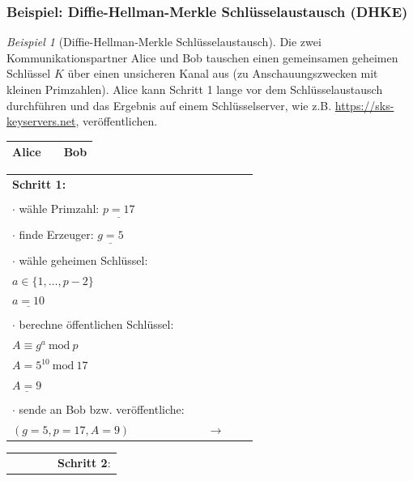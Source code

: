 \documentclass[
  a4paper,
  11pt,
]{scrartcl}
\theoremstyle{plain}
\theoremstyle{definition}
\theoremstyle{remark}
\newtheorem{beispiel}{Beispiel}
\newcommand{\Mod}[1]{\ \mathrm{mod}\ #1}
\begin{document}
\subsubsection{Beispiel: Diffie-Hellman-Merkle Schlüsselaustausch (DHKE)}
\label{sub:dhke_beispiel}
\begin{beispiel}[Diffie-Hellman-Merkle Schlüsselaustausch]\label{bsp:dhke}
  Die zwei Kommunikationspartner Alice und Bob tauschen einen gemeinsamen
  geheimen Schlüssel $K$ über einen unsicheren Kanal aus (zu Anschauungszwecken
  mit kleinen Primzahlen). Alice kann Schritt 1 lange vor dem Schlüsselaustausch
  durchführen und das Ergebnis auf einem Schlüsselserver, wie z.B.
  \url{https://sks-keyservers.net}, veröffentlichen.
  \begin{center}
    \begin{tabularx}{\textwidth}{lXr}
      \textbf{Alice} & & \textbf{Bob}\\
      \midrule
    \end{tabularx}
    \begin{tabularx}{\textwidth}{lXcXl}
      \textbf{Schritt 1:} & & & & \\
      & & & & \\
      $\cdot$ wähle Primzahl: $\underline{p = 17}$ & & & & \\
      & & & & \\
      $\cdot$ finde Erzeuger: $\underline{g = 5}$ & & & & \\
      & & & & \\
      $\cdot$ wähle geheimen Schlüssel: & & & & \\
      $a \in \{1, \dots, p-2\}$ & & & & \\
      $\underline{a = 10}$ & & & & \\
      & & & & \\
      $\cdot$ berechne öffentlichen Schlüssel: & & & & \\
      $A \equiv g^a \Mod{p}$ & & & & \\
      $A = 5^{10} \Mod{17}$ & & & & \\
      $\underline{A = 9}$ & & & & \\
      & & & & \\
      $\cdot$ sende an Bob bzw. veröffentliche: & & & & \\
      $(g = 5, p = 17, A = 9)$ & & $\to$ & & \\\midrule
    \end{tabularx}
    \begin{tabularx}{\textwidth}{lXcXl}
      & & & & \textbf{Schritt 2}:\\

\end{tabularx}
\end{center}
\end{beispiel}
\end{document}
